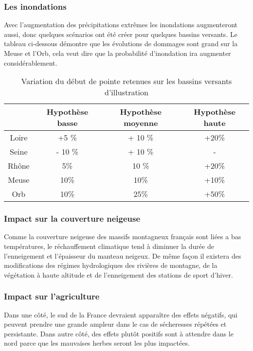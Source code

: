 \documentclass[a4paper,10pt]{article}
\begin{document}
\subsubsection*{Les inondations}
Avec  l'augmentation des  précipitations extrêmes  les  inondations augmenteront
aussi, donc quelques scénarios ont été créer pour quelques bassins versants.
Le tableau ci-dessous démontre que les  évolutions de dommages sont grand sur la
Meuse et  l'Orb, cela veut dire  que la probabilité  d'inondation ira augmenter
considérablement. 


\begin{table}[H]
  \begin{center}
    \caption{Variation du début de pointe retenues sur les bassins versants d’illustration}
    \begin{tabular}{|c|c|c|c|}
      \hline
      & Hypothèse basse &Hypothèse moyenne &Hypothèse haute\\
      \hline
      Loire & +5 \% & + 10 \% & +20\%\\
      Seine & - 10 \% &+ 10 \% & - \\ 
      Rhône & 5\% & 10 \% & +20\%\\
      Meuse & 10\%& 10\%& +10\%\\
      Orb &10\% & 25\% & +50\% \\
      \hline
    \end{tabular}
  \end{center}
\end{table}

\subsubsection*{Impact sur la couverture neigeuse}
Comme la  couverture neigeuse des massifs  montagneux français sont  liées a bas
températures,  le   réchauffement  climatique  tend  à  diminuer   la  durée  de
l’enneigement et l’épaisseur  du manteau neigeux. De même  façon il existera des
modifications  des  régimes  hydrologiques  des  rivières  de  montagne,  de  la
végétation à haute altitude et de l’enneigement des stations de sport d’hiver. 


\subsubsection*{Impact sur l’agriculture}
Dans une côté, le sud de la France devraient apparaître des effets négatifs, qui
peuvent  prendre une  grande  ampleur dans  le  cas de  sécheresses répétées  et
persistante. Dans autre côté, des effets plutôt positifs sont à attendre dans le
nord parce que les mauvaises herbes seront les plus impactées.
\end{document}
